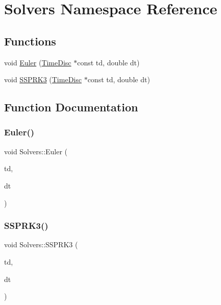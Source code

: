 \hypertarget{namespaceSolvers}{}\section{Solvers Namespace Reference}
\label{namespaceSolvers}
\subsection*{Functions}
\begin{DoxyCompactItemize}
\item 
void \hyperlink{namespaceSolvers_a5419333bd166e0834bd0a72dfbad751a}{Euler} (\hyperlink{structTimeDisc}{Time\+Disc} $\ast$const td, double dt)
\item 
void \hyperlink{namespaceSolvers_a850a96cbc5caac2bb721125672b69978}{S\+S\+P\+R\+K3} (\hyperlink{structTimeDisc}{Time\+Disc} $\ast$const td, double dt)
\end{DoxyCompactItemize}


\subsection{Function Documentation}
\mbox{\label{namespaceSolvers_a5419333bd166e0834bd0a72dfbad751a}} 
\subsubsection{\texorpdfstring{Euler()}{Euler()}}
{\footnotesize\ttfamily void Solvers\+::\+Euler (\begin{DoxyParamCaption}\item[{\hyperlink{structTimeDisc}{Time\+Disc} $\ast$const}]{td,  }\item[{double}]{dt }\end{DoxyParamCaption})}

\mbox{\label{namespaceSolvers_a850a96cbc5caac2bb721125672b69978}} 
\subsubsection{\texorpdfstring{S\+S\+P\+R\+K3()}{SSPRK3()}}
{\footnotesize\ttfamily void Solvers\+::\+S\+S\+P\+R\+K3 (\begin{DoxyParamCaption}\item[{\hyperlink{structTimeDisc}{Time\+Disc} $\ast$const}]{td,  }\item[{double}]{dt }\end{DoxyParamCaption})}

